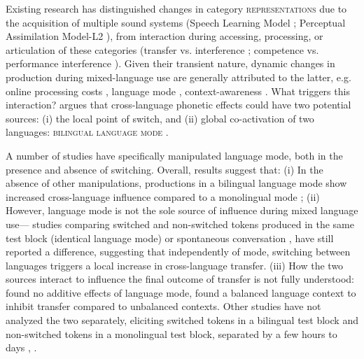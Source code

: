 \documentclass[12 pt]{article}
\begin{document}
Existing research has distinguished changes in category \textsc{representations} due to the acquisition of multiple sound systems (Speech Learning Model \citep{flege1995second,flege2007language}; Perceptual Assimilation Model-L2 \citep{best2007nonnative}), from interaction during accessing, processing, or articulation of these categories (transfer vs. interference \citep{grosjean2012attempt}; competence vs. performance interference \citep{paradis1993linguistic}). 
Given their transient nature, dynamic changes in production during mixed-language use are generally attributed to the latter, e.g. online processing costs \citep[][VOT]{olson2013bilingual,tsui2019impact,vsimavckova2015immediate}, language mode \citep[][vowel quality]{simonet2014phonetic}, context-awareness \citep[][phonological variables]{khattab2013phonetic}. What triggers this interaction? \cite{olson2016role} argues that cross-language phonetic effects could have two potential sources: (i) the local point of switch, and (ii) global co-activation of two languages: \textsc{bilingual language mode} \citep{grosjean1998studying}.

A number of studies have specifically manipulated language mode, both in the presence and absence of switching. Overall, results suggest that: (i) In the absence of other manipulations, productions in a bilingual language mode show increased cross-language influence compared to a monolingual mode \citep[][vowel quality]{simonet2020increased,simonet2014phonetic}; (ii) However, language mode is not the sole source of influence during mixed language use--- studies comparing switched and non-switched tokens produced in the same test block (identical language mode) \citep[][VOT]{olson2016role,tsui2019impact} or spontaneous conversation \citep[][VOT]{piccinini2015voice}, have still reported a difference, suggesting that independently of mode, switching between languages triggers a local increase in cross-language transfer. (iii) How the two sources interact to influence the final outcome of transfer is not fully understood: \citet[][VOT]{olson2016role} found no additive effects of language mode, \citet[][VOT]{olson2013bilingual} found a balanced language context to inhibit transfer compared to unbalanced contexts.  Other studies have not analyzed the two separately, eliciting switched tokens in a bilingual test block and non-switched tokens in a monolingual test block, separated by a few hours to days \citep[][vowel quality]{elias2017effects}, \citep[][VOT]{schwartz2015language, bullock2009trying,antoniou2011inter, vsimavckova2015immediate,vsimavckova2018patterns}.
\end{document}
